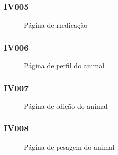 \documentclass[12pt]{article}
\begin{document}
\subsubsection{IV005}

\begin{figure}[!h]
	\begin{center}
		\caption{Página de medicação}


	\end{center}
\end{figure}


\subsubsection{IV006}

\begin{figure}[!h]
	\begin{center}
		\caption{Página de perfil do animal}


	\end{center}
\end{figure}

\newpage

\subsubsection{IV007}

\begin{figure}[!h]
	\begin{center}
		\caption{Página de edição do animal}


	\end{center}
\end{figure}


\subsubsection{IV008}

\begin{figure}[!h]
	\begin{center}
		\caption{Página de pesagem do animal}


	\end{center}
\end{figure}
\end{document}
